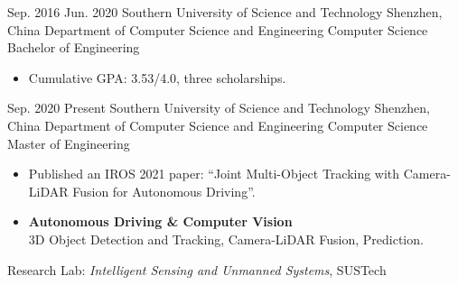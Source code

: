 \documentclass{resume}
\begin{document}
\makeheader

\begin{educations}
  \education%
    {Sep. 2016}%
    {Jun. 2020}%
    {Southern University of Science and Technology}%
    {Shenzhen, China}%
    {Department of Computer Science and Engineering}%
    {Computer Science}%
    {Bachelor of Engineering}%
	{\begin{itemize}%
		\item Cumulative GPA: 3.53/4.0, three scholarships.
	\end{itemize}}%
 \education%
    {Sep. 2020}%
    {Present}%
    {Southern University of Science and Technology}%
    {Shenzhen, China}%
    {Department of Computer Science and Engineering}%
    {Computer Science}%
    {Master of Engineering}%
	{\begin{itemize}%
		\item Published an IROS 2021 paper: ``Joint Multi-Object Tracking with Camera-LiDAR Fusion for Autonomous Driving''.
	\end{itemize}}%
	
\end{educations}
	
\begin{itemize}
  \item \textbf{Autonomous Driving \& Computer Vision}\\
  	3D Object Detection and Tracking, Camera-LiDAR Fusion, Prediction.
\end{itemize}


Research Lab: \textit{Intelligent Sensing and Unmanned Systems}, SUSTech
\end{document}
